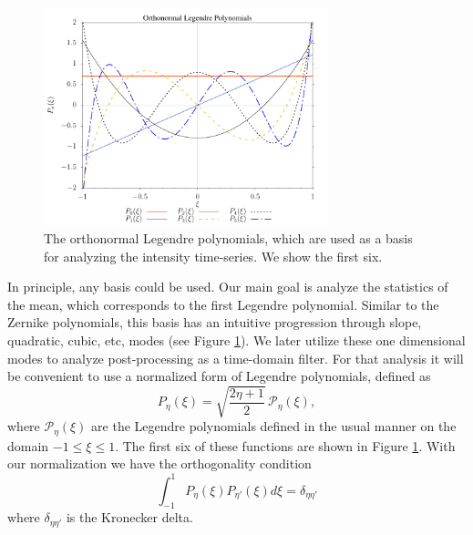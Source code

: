 \documentclass[10pt,preprint]{aastex631}
\begin{document}
\begin{figure}[h]
    \centering
    \includegraphics[width=3.25in]{onLegPol.pdf}
    \caption{The orthonormal Legendre polynomials, which are used as a basis for analyzing the intensity time-series.  We show the first six. \label{fig:onlegpol}}
\end{figure}

In principle, any basis could be used.  Our main goal is analyze the statistics of the mean, which corresponds to the first Legendre polynomial.  Similar to the Zernike polynomials, this basis has an intuitive progression through slope, quadratic, cubic, etc, modes (see Figure \ref{fig:onlegpol}). We later utilize these one dimensional modes to analyze post-processing as a time-domain filter.  For that analysis it will be convenient to use a normalized form of Legendre polynomials, defined as
\begin{equation}
P_{\eta}(\xi) = \sqrt{\frac{2\eta+1}{2}}\, \mathscr{P}_\eta(\xi),
\label{eqn:basis}
\end{equation}
where $\mathscr{P}_\eta(\xi)$ are the Legendre polynomials defined in the usual manner \citep[cf.][]{Olver:2010:NHMF} on the domain $-1 \le \xi \le 1$. The first six of these functions are shown in Figure \ref{fig:onlegpol}.  With our normalization we have the orthogonality condition
\begin{equation}
\int_{-1}^{1}P_\eta(\xi)P_{\eta'}(\xi) d\xi = \delta_{\eta\eta'}
\label{eqn:orthonormal}
\end{equation}
where $\delta_{\eta\eta'}$ is the Kronecker delta. 
\end{document}
